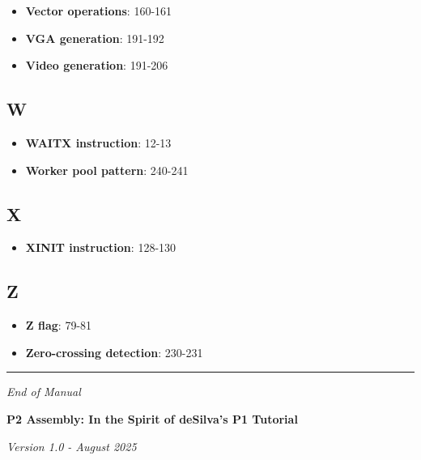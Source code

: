 \documentclass[11pt]{book}
\providecommand{\tightlist}{%
  \setlength{\itemsep}{0pt}\setlength{\parskip}{0pt}}
\begin{document}
\begin{itemize}
\tightlist
\item
  \textbf{Vector operations}: 160-161
\item
  \textbf{VGA generation}: 191-192
\item
  \textbf{Video generation}: 191-206
\end{itemize}

\hypertarget{w}{%
\subsection{W}\label{w}}

\begin{itemize}
\tightlist
\item
  \textbf{WAITX instruction}: 12-13
\item
  \textbf{Worker pool pattern}: 240-241
\end{itemize}

\hypertarget{x}{%
\subsection{X}\label{x}}

\begin{itemize}
\tightlist
\item
  \textbf{XINIT instruction}: 128-130
\end{itemize}

\hypertarget{z}{%
\subsection{Z}\label{z}}

\begin{itemize}
\tightlist
\item
  \textbf{Z flag}: 79-81
\item
  \textbf{Zero-crossing detection}: 230-231
\end{itemize}

\begin{center}\rule{0.5\linewidth}{0.5pt}\end{center}

\emph{End of Manual}

\textbf{P2 Assembly: In the Spirit of deSilva's P1 Tutorial}

\emph{Version 1.0 - August 2025}

\printindex
\end{document}
